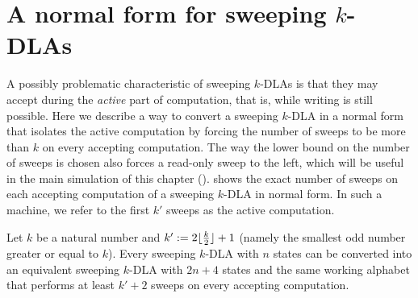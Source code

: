 \section{A normal form for sweeping \texorpdfstring{$k$}{k}-DLAs}\label{sec:equiv-swep-dla}
A possibly problematic characteristic of sweeping $k$-DLAs is that they may accept during the \emph{active} part of computation, that is, while writing is still possible.
Here we describe a way to convert a sweeping $k$-DLA in a normal form that isolates the active computation by forcing the number of sweeps to be more than $k$ on every accepting computation.
The way the lower bound on the number of sweeps is chosen also forces a read-only sweep to the left, which will be useful in the main simulation of this chapter ().
 shows the exact number of sweeps on each accepting computation of a sweeping $k$-DLA in normal form.
In such a machine, we refer to the first $k'$ sweeps as the active computation.
\begin{thrm}\label{thm:equiv-swep-dla}
	Let $k$ be a natural number and $k':=2\lfloor \frac{k}{2} \rfloor+1$ (namely the smallest odd number greater or equal to $k$).
	Every sweeping $k$-DLA with $n$ states can be converted into an equivalent sweeping $k$-DLA with $2n+4$ states and the same working alphabet that performs at least $k'+2$ sweeps on every accepting computation.
\end{thrm}
